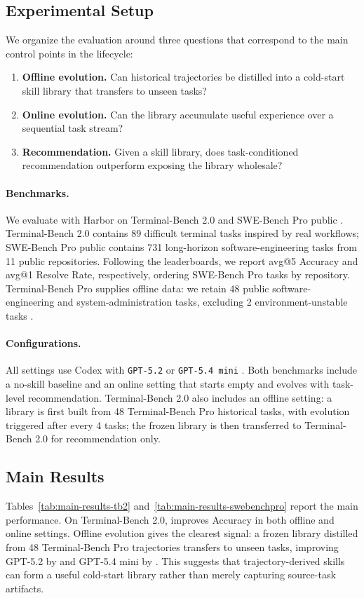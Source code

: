 \subsection{Experimental Setup}
We organize the evaluation around three questions that correspond to the main control points in the \ours lifecycle:
\begin{enumerate}
    \item \textbf{Offline evolution.} Can historical trajectories be distilled into a cold-start skill library that transfers to unseen tasks?
    \item \textbf{Online evolution.} Can the library accumulate useful experience over a sequential task stream?
    \item \textbf{Recommendation.} Given a skill library, does task-conditioned recommendation outperform exposing the library wholesale?
\end{enumerate}

\paragraph{Benchmarks.}
We evaluate \ours with Harbor on Terminal-Bench 2.0 and SWE-Bench Pro public \citep{harborFramework,merrill2026terminal,deng2025swe}. Terminal-Bench 2.0 contains 89 difficult terminal tasks inspired by real workflows; SWE-Bench Pro public contains 731 long-horizon software-engineering tasks from 11 public repositories. Following the leaderboards, we report avg@5 Accuracy and avg@1 Resolve Rate, respectively, ordering SWE-Bench Pro tasks by repository. Terminal-Bench Pro supplies offline data: we retain 48 public software-engineering and system-administration tasks, excluding 2 environment-unstable tasks \citep{wang2025let}.

\paragraph{Configurations.}
All settings use Codex with \texttt{GPT-5.2} or \texttt{GPT-5.4 mini} \citep{openai2025gpt52,openai2026gpt54MiniNano}. Both benchmarks include a no-skill baseline and an online setting that starts empty and evolves with task-level recommendation. Terminal-Bench 2.0 also includes an offline setting: a library is first built from 48 Terminal-Bench Pro historical tasks, with evolution triggered after every 4 tasks; the frozen library is then transferred to Terminal-Bench 2.0 for recommendation only.

\subsection{Main Results}
Tables~\ref{tab:main-results-tb2} and~\ref{tab:main-results-swebenchpro} report the main performance. On Terminal-Bench 2.0, \ours improves Accuracy in both offline and online settings. Offline evolution gives the clearest signal: a frozen library distilled from 48 Terminal-Bench Pro trajectories transfers to unseen tasks, improving GPT-5.2 by  and GPT-5.4 mini by . This suggests that trajectory-derived skills can form a useful cold-start library rather than merely capturing source-task artifacts.

